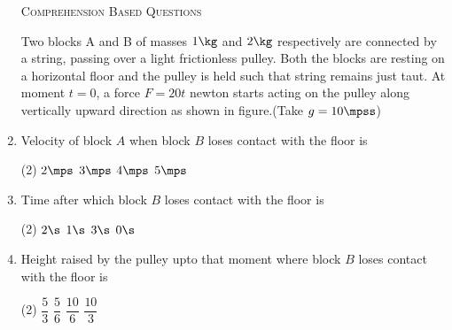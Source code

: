 \documentclass{article}
\renewcommand{\ans}{\quad}
\begin{document}
\begin{enumerate}
    \begin{center}
        \textsc{Comprehension Based Questions}
    \end{center}
    Two blocks A and B of masses $1 \kg$ and $2 \kg$ respectively are connected by a string, passing over a light frictionless pulley. Both the blocks are resting on a horizontal floor and the pulley is held such that string remains just taut. At moment $t = 0$, a force $F = 20 t$ newton starts acting on the pulley along vertically upward direction as shown in figure.(Take $g = 10 \mpss$)
    \begin{center}
    \end{center}
    \item Velocity of block $A$ when block $B$ loses contact with the floor is
    \begin{tasks}(2)
        \task $2\mps$
        \task $3\mps$
        \task $4\mps$
        \task $5\mps$\ans
    \end{tasks}

    \item Time after which block $B$ loses contact with the floor is
    \begin{tasks}(2)
        \task $2\s$\ans
        \task $1\s$
        \task $3\s$
        \task $0\s$
    \end{tasks}

    \item Height raised by the pulley upto that moment where block $B$ loses contact with the floor is
    \begin{tasks}(2)
        \task $\dfrac{5}{3}$
        \task $\dfrac{5}{6}$\ans
        \task $\dfrac{10}{6}$
        \task $\dfrac{10}{3}$
    \end{tasks}
    

    

\end{enumerate}
\end{document}
